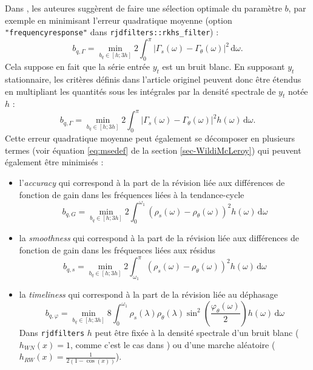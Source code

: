 \documentclass[
  12pt,
  french,
  12pt,a4paper]{article}
\newcommand\1{\mathds{1}}
\newcommand\ud{\,\mathrm{d}}
\begin{document}
Dans \textcite{dagumbianconcini2015new}, les auteures suggèrent de faire une sélection optimale du paramètre \(b\), par exemple en minimisant l'erreur quadratique moyenne (option \texttt{"frequencyresponse"} dans \texttt{rjdfilters::rkhs\_filter}) :
\[
b_{q,\Gamma}=\underset{b_q\in[h; 3h]}{\min}
2\int_{0}^{\pi}
\lvert \Gamma_s(\omega)-\Gamma_\theta(\omega)\rvert^2\ud \omega.
\]
Cela suppose en fait que la série entrée \(y_t\) est un bruit blanc.
En supposant \(y_t\) stationnaire, les critères définis dans l'article originel peuvent donc être étendus en multipliant les quantités sous les intégrales par la densité spectrale de \(y_t\) notée \(h\) :
\[
b_{q,\Gamma}=\underset{b_q\in[h; 3h]}{\min}
2\int_{0}^{\pi}
\lvert \Gamma_s(\omega)-\Gamma_\theta(\omega)\rvert^2h(\omega)\ud \omega.
\]
Cette erreur quadratique moyenne peut également se décomposer en plusieurs termes (voir équation \eqref{eq:msedef} de la section \ref{sec-WildiMcLeroy}) qui peuvent également être minimisés :

\begin{itemize}
\item
  l'\emph{accuracy} qui correspond à la part de la révision liée aux différences de fonction de gain dans les fréquences liées à la tendance-cycle
  \[
  b_{q,G}=\underset{b_q\in[h; 3h]}{\min}
  2\int_{0}^{\omega_1}
  \left(\rho_s(\omega)-\rho_\theta(\omega)\right)^{2} h(\omega)\ud \omega
  \]
\item
  la \emph{smoothness} qui correspond à la part de la révision liée aux différences de fonction de gain dans les fréquences liées aux résidus
  \[
  b_{q,s}=\underset{b_q\in[h; 3h]}{\min}
  2\int_{\omega_1}^{\pi}
  \left(\rho_s(\omega)-\rho_\theta(\omega)\right)^{2} h(\omega)\ud \omega
  \]
\item
  la \emph{timeliness} qui correspond à la part de la révision liée au déphasage
  \[
  b_{q,\varphi}=\underset{b_q\in[h; 3h]}{\min}
  8\int_{0}^{\omega_1}
  \rho_s(\lambda)\rho_\theta(\lambda)\sin^{2}\left(\frac{\varphi_\theta(\omega)}{2}\right)h(\omega)\ud \omega
  \]
  Dans \texttt{rjdfilters} \(h\) peut être fixée à la densité spectrale d'un bruit blanc (\(h_{WN}(x)=1\), comme c'est le cas dans \textcite{dagumbianconcini2015new}) ou d'une marche aléatoire (\(h_{RW}(x)=\frac{1}{2(1-\cos(x))}\)).
\end{itemize}
\end{document}
